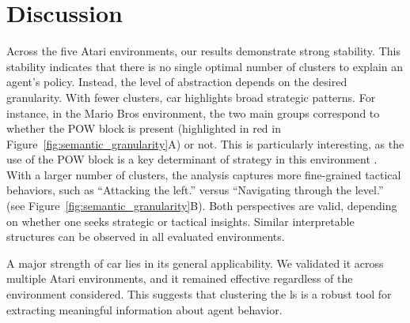 \section{Discussion}
\label{sec:clustering_agent_representation_discussion}



Across the five Atari environments, our results demonstrate strong stability.
This stability indicates that there is no single optimal number of clusters to explain an agent's policy.
Instead, the level of abstraction depends on the desired granularity.
With fewer clusters, \gls{car} highlights broad strategic patterns.
For instance, in the Mario Bros environment, the two main groups correspond to whether the POW block is present (highlighted in red in Figure~\ref{fig:semantic_granularity}A) or not.
This is particularly interesting, as the use of the POW block is a key determinant of strategy in this environment \cite{mario_bros_atari_2600}.
With a larger number of clusters, the analysis captures more fine-grained tactical behaviors, such as ``Attacking the left.'' versus ``Navigating through the level.'' (see Figure~\ref{fig:semantic_granularity}B).
Both perspectives are valid, depending on whether one seeks strategic or tactical insights.
Similar interpretable structures can be observed in all evaluated environments.

A major strength of \gls{car} lies in its general applicability.
We validated it across multiple Atari environments, and it remained effective regardless of the environment considered.
This suggests that clustering the \gls{ls} is a robust tool for extracting meaningful information about agent behavior.

